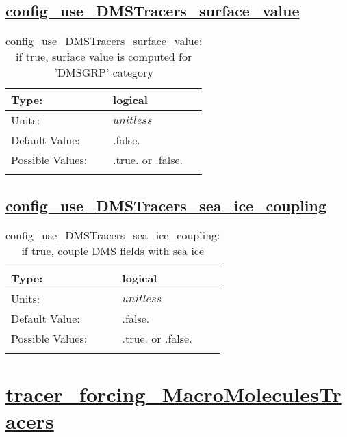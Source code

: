\subsection[config\_use\_DMSTracers\_surface\_value]{\hyperref[sec:nm_tab_tracer_forcing_DMSTracers]{config\_use\_DMSTracers\_surface\_value}}
\label{subsec:nm_sec_config_use_DMSTracers_surface_value}
\begin{center}
\begin{longtable}{| p{2.0in} || p{4.0in} |}
    \hline
    Type: & logical \\
    \hline
    Units: & $unitless$ \\
    \hline
    Default Value: & .false. \\
    \hline
    Possible Values: & .true. or .false. \\
    \hline
    \caption{config\_use\_DMSTracers\_surface\_value: if true, surface value is computed for 'DMSGRP' category}
\end{longtable}
\end{center}
\subsection[config\_use\_DMSTracers\_sea\_ice\_coupling]{\hyperref[sec:nm_tab_tracer_forcing_DMSTracers]{config\_use\_DMSTracers\_sea\_ice\_coupling}}
\label{subsec:nm_sec_config_use_DMSTracers_sea_ice_coupling}
\begin{center}
\begin{longtable}{| p{2.0in} || p{4.0in} |}
    \hline
    Type: & logical \\
    \hline
    Units: & $unitless$ \\
    \hline
    Default Value: & .false. \\
    \hline
    Possible Values: & .true. or .false. \\
    \hline
    \caption{config\_use\_DMSTracers\_sea\_ice\_coupling: if true, couple DMS fields with sea ice}
\end{longtable}
\end{center}
\section[tracer\_forcing\_MacroMoleculesTracers]{\hyperref[sec:nm_tab_tracer_forcing_MacroMoleculesTracers]{tracer\_forcing\_MacroMoleculesTracers}}
\label{sec:nm_sec_tracer_forcing_MacroMoleculesTracers}
